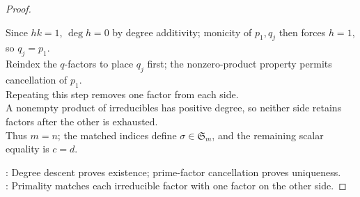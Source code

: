 \begin{theorem}
\begin{proof}
\begin{enumerate}[label=(\roman*)]
Since $hk=1$, $\deg h=0$ by degree additivity; monicity of $p_1,q_j$ then forces $h=1$, so $q_j=p_1$.\\
Reindex the $q$-factors to place $q_j$ first; the nonzero-product property permits cancellation of $p_1$.\\
Repeating this step removes one factor from each side.\\
A nonempty product of irreducibles has positive degree, so neither side retains factors after the other is exhausted.\\
Thus $m=n$; the matched indices define $\sigma\in\mathfrak{S}_m$, and the remaining scalar equality is $c=d$.
\end{enumerate}
: Degree descent proves existence; prime-factor cancellation proves uniqueness.\\
: Primality matches each irreducible factor with one factor on the other side.
\end{proof}
\end{theorem}
